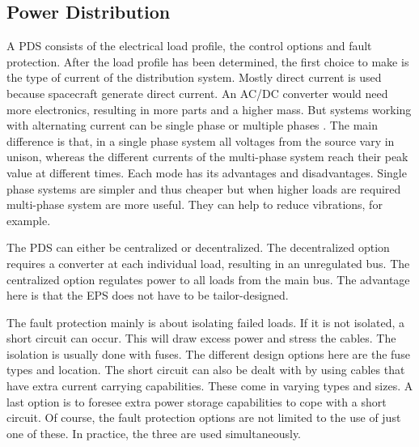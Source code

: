 \subsection{Power Distribution}
\label{blDOdistribution}

A \ac{PDS} consists of the electrical load profile, the control options and fault protection. After the load profile has been determined, the first choice to make is the type of current of the distribution system. Mostly direct current is used because spacecraft generate direct current. An AC/DC converter would need more electronics, resulting in more parts and a higher mass. But systems working with alternating current can be single phase or multiple phases \cite{kuphaldt}. The main difference is that, in a single phase system all voltages from the source vary in unison, whereas the different currents of the multi-phase system reach their peak value at different times. Each mode has its advantages and disadvantages. Single phase systems are simpler and thus cheaper but when higher loads are required multi-phase system are more useful. They can help to reduce vibrations, for example.

The PDS can either be centralized or decentralized. The decentralized option requires a converter at each individual load, resulting in an unregulated bus. The centralized option regulates power to all loads from the main bus. The advantage here is that the EPS does not have to be tailor-designed. 

The fault protection mainly is about isolating failed loads. If it is not isolated, a short circuit can occur. This will draw excess power and stress the cables. The isolation is usually done with fuses. The different design options here are the fuse types and location.
The short circuit can also be dealt with by using cables that have extra current carrying capabilities. These come in varying types and sizes.
A last option is to foresee extra power storage capabilities to cope with a short circuit.
Of course, the fault protection options are not limited to the use of just one of these. In practice, the three are used simultaneously.